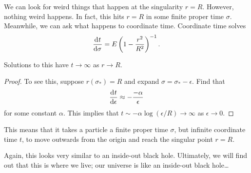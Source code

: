 We can look for weird things that happen at the singularity $r = R$. However, nothing weird happens. In fact, this hits $r = R$ in some finite proper time $\sigma$. 
Meanwhile, we can ask what happens to coordinate time.
Coordinate time solves
\begin{equation}
  \dv[]{t}{\sigma} = E \left( 1 - \frac{r^2}{R^2} \right)^{-1}.
\end{equation}
\begin{claim}
  Solutions to this have $t \to \infty$ as $r \to R$.
\end{claim}
\begin{proof}
  To see this, suppose $r(\sigma_*) = R$ and expand $\sigma = \sigma_* - \epsilon$. Find that
  \begin{equation}
    \dv[]{t}{\epsilon} \approx - \frac{-\alpha}{\epsilon}
  \end{equation}
  for some constant $\alpha$.
  This implies that $t \sim -\alpha \log(\epsilon / R) \to \infty$ as $\epsilon \to 0$.
\end{proof}
This means that it takes a particle a finite proper time $\sigma$, but infinite coordinate time $t$, to move outwards from the origin and reach the singular point $r = R$.
\begin{leftbar}
  \begin{remark}
    Again, this looks very similar to an inside-out black hole.
    Ultimately, we will find out that this is where we live; our universe is like an inside-out black hole\dots
  \end{remark}
\end{leftbar}
